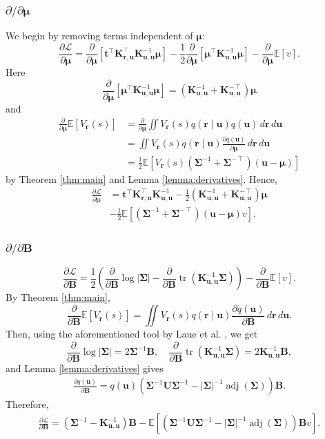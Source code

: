 \documentclass{mpaper}
\DeclareMathOperator{\adj}{adj}
\DeclareMathOperator{\tr}{tr}
\newcommand{\V}{V_{\mathbf{r}}}
\newcommand{\dx}{\,d\mathbf{r}\,d\mathbf{u}}
\newcommand{\Kuu}{\mathbf{K}_{\mathbf{u},\mathbf{u}}}
\newcommand{\Kru}{\mathbf{K}_{\mathbf{r},\mathbf{u}}}
\newcommand{\dm}{\frac{\partial}{\partial\bm\mu}}
\newcommand{\dB}{\frac{\partial}{\partial\mathbf{B}}}
\begin{document}
\subsubsection{\texorpdfstring{$\partial/\partial\bm\mu$}{Derivative w.r.t. mu}}

We begin by removing terms independent of $\bm\mu$:
\[
  \frac{\partial\mathcal{L}}{\partial\bm\mu} =
  \dm[\mathbf{t}^\intercal\Kru^\intercal\Kuu^{-1}\bm\mu] - \frac{1}{2} \dm
  \left[ \bm\mu^\intercal \Kuu^{-1} \bm\mu \right] - \dm\mathbb{E}[v].
\]
Here
\[
  \dm \left[ \bm\mu^\intercal \Kuu^{-1} \bm\mu \right] = (\Kuu^{-1} +
  \Kuu^{-\intercal}) \bm\mu
\] %
and
\[
  \begin{split}
    \dm\mathbb{E}[\V(s)] &= \dm\iint \V(s) q(\mathbf{r} \mid \mathbf{u})
    q(\mathbf{u})\dx \\
    &= \iint \V(s) q(\mathbf{r} \mid \mathbf{u}) \frac{\partial
      q(\mathbf{u})}{\partial \bm\mu}\dx \\
    &= \frac{1}{2}\mathbb{E}[\V(s) (\bm\Sigma^{-1} +
    \bm\Sigma^{-\intercal})(\mathbf{u} - \bm\mu)]
  \end{split}
\]
by Theorem \ref{thm:main} and Lemma \ref{lemma:derivatives}. Hence,
\[
  \begin{split}
    \frac{\partial\mathcal{L}}{\partial\bm\mu} &=
    \mathbf{t}^\intercal\Kru^\intercal\Kuu^{-1} - \frac{1}{2} (\Kuu^{-1} +
    \Kuu^{-\intercal}) \bm\mu \\
    &- \frac{1}{2}\mathbb{E} \left[(\bm\Sigma^{-1} +
      \bm\Sigma^{-\intercal})(\mathbf{u} - \bm\mu) v \right].
  \end{split}
\]

\subsubsection{\texorpdfstring{$\partial/\partial\mathbf{B}$}{Derivative w.r.t. B}}

\[
  \frac{\partial\mathcal{L}}{\partial\mathbf{B}} =
  \frac{1}{2} \left( \dB\log|\bm\Sigma| - \dB\tr \left( \Kuu^{-1} \bm\Sigma
    \right) \right)
  - \dB\mathbb{E}[v].
\]
By Theorem \ref{thm:main},
\[
  \dB\mathbb{E}[\V(s)] = \iint \V(s) q(\mathbf{r} \mid \mathbf{u})
  \frac{\partial q(\mathbf{u})}{\partial \mathbf{B}}\dx.
\]
Then, using the aforementioned tool by Laue et al.
\cite{DBLP:conf/nips/LaueMG18}, we get
\[
  \dB\log|\bm\Sigma| = 2\bm\Sigma^{-1}\mathbf{B}, \quad \dB \tr \left( \Kuu^{-1}
    \bm\Sigma \right) = 2\Kuu^{-1}\mathbf{B},
\]
and Lemma \ref{lemma:derivatives} gives
\begin{gather*}
  \frac{\partial q(\mathbf{u})}{\partial \mathbf{B}} =
  q(\mathbf{u})(\bm\Sigma^{-1}\mathbf{U}\bm\Sigma^{-1} -
  |\bm\Sigma|^{-1}\adj(\bm\Sigma))\mathbf{B}.
\end{gather*}
Therefore,
\begin{gather*}
  \frac{\partial \mathcal{L}}{\partial \mathbf{B}} =
  \left( \bm\Sigma^{-1} - \Kuu^{-1} \right) \mathbf{B} - \mathbb{E}
  [(\bm\Sigma^{-1}\mathbf{U}\bm\Sigma^{-1} -
  |\bm\Sigma|^{-1}\adj(\bm\Sigma))\mathbf{B}v].
\end{gather*}
\end{document}
